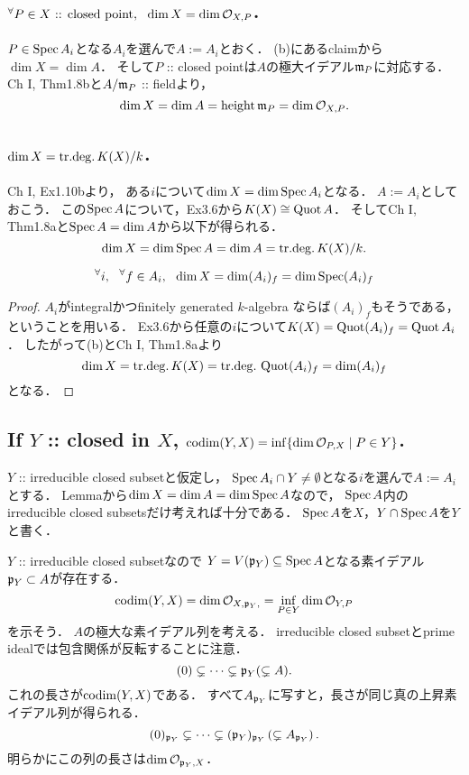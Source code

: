 \documentclass[a4paper]{jsarticle}
\newcommand{\shO}{\mathcal{O}}
\begin{document}
    \subsection{$\Forall{P \in X\text{ :: closed point}} \dim X=\dim \shO_{X,P}$.}
    $P \in \operatorname{Spec} A_i$となる$A_i$を選んで$A:=A_i$とおく．
    (b)にあるclaimから$\dim X=\dim A$．
    そして$P$ :: closed pointは$A$の極大イデアル$\mathfrak{m}_P$に対応する．
    Ch I, Thm1.8bと$A/\mathfrak{m}_P$ :: fieldより，
    \[ \dim X=\dim A=\height \I{m}_P=\dim \shO_{X,P}. \]

    \subsection{$\dim X=\mathrm{tr.deg.\,} K(X)/k$.}
    Ch I, Ex1.10bより，
    ある$i$について$\dim X=\dim \operatorname{Spec} A_i$となる．
    $A:=A_i$としておこう．
    この$\operatorname{Spec} A$について，Ex3.6から$K(X) \cong \operatorname{Quot} A$．
    そしてCh I, Thm1.8aと$\operatorname{Spec} A=\dim A$から以下が得られる．
    \[ \dim X=\dim \operatorname{Spec} A=\dim A=\mathrm{tr.deg.\,} K(X)/k. \]

    \begin{Lemma}
    \[ {}^{\forall} i,~~ {}^{\forall} f \in A_i,~~ \dim X=\dim (A_i)_f=\dim \operatorname{Spec} (A_i)_f \] 
    \end{Lemma}
    \begin{proof}
        $A_i$がintegralかつfinitely generated $k$-algebra
        ならば$(A_i)_f$もそうである，ということを用いる．
        Ex3.6から任意の$i$について$K(X)=\operatorname{Quot} (A_i)_f=\operatorname{Quot} A_i$．
        したがって(b)とCh I, Thm1.8aより
        \[ \dim X=\mathrm{tr.deg.\,} K(X)=\mathrm{tr.deg.\,} \operatorname{Quot} (A_i)_f=\dim (A_i)_f \]
        となる．
    \end{proof}

    \subsection{If $Y$ :: closed in $X$, $\codim(Y,X)=\inf\{\dim \shO_{P,X} \mid P \in Y\}$.}
    $Y$ :: irreducible closed subsetと仮定し，
    $\operatorname{Spec} A_i \cap Y \neq \emptyset$となる$i$を選んで$A:=A_i$とする．
    Lemmaから$\dim X=\dim A=\dim \operatorname{Spec} A$なので，
    $\operatorname{Spec} A$内のirreducible closed subsetsだけ考えれば十分である．
    $\operatorname{Spec} A$を$X$，$Y \cap \operatorname{Spec} A$を$Y$と書く．

    $Y$ :: irreducible closed subsetなので
    $Y=V(\mathfrak{p}_Y) \subseteq \operatorname{Spec} A$となる素イデアル$\mathfrak{p}_Y \subset A$が存在する．
    \[ \codim(Y,X)=\dim \shO_{X, \I{p}_Y,}=\inf_{P \in Y} \dim \shO_{Y,P} \]を示そう．
    $A$の極大な素イデアル列を考える．
    irreducible closed subsetとprime idealでは包含関係が反転することに注意．
    \[ (0) \subsetneq \dots \subsetneq \mathfrak{p}_Y (\subsetneq A). \]
    これの長さが$\operatorname{codim}(Y,X)$である．
    すべて$A_{\mathfrak{p}_Y}$に写すと，長さが同じ真の上昇素イデアル列が得られる．
    \[ (0)_{\mathfrak{p}_Y} \subsetneq \dots \subsetneq (\mathfrak{p}_Y)_{\mathfrak{p}_Y} \left(\subsetneq A_{\mathfrak{p}_Y} \right). \]
    明らかにこの列の長さは$\dim \shO_{\I{p}_Y, X}$．
\end{document}
